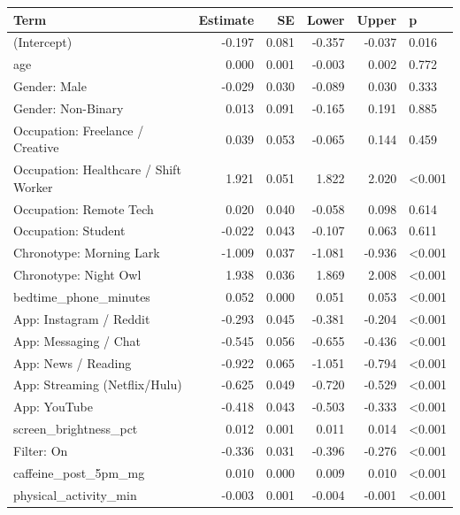 
\begin{tabular}{lrrrrl}
\toprule
Term & Estimate & SE & Lower & Upper & p\\
\midrule
(Intercept) & -0.197 & 0.081 & -0.357 & -0.037 & 0.016\\
age & 0.000 & 0.001 & -0.003 & 0.002 & 0.772\\
Gender: Male & -0.029 & 0.030 & -0.089 & 0.030 & 0.333\\
Gender: Non-Binary & 0.013 & 0.091 & -0.165 & 0.191 & 0.885\\
Occupation: Freelance / Creative & 0.039 & 0.053 & -0.065 & 0.144 & 0.459\\
Occupation: Healthcare / Shift Worker & 1.921 & 0.051 & 1.822 & 2.020 & <0.001\\
Occupation: Remote Tech & 0.020 & 0.040 & -0.058 & 0.098 & 0.614\\
Occupation: Student & -0.022 & 0.043 & -0.107 & 0.063 & 0.611\\
Chronotype: Morning Lark & -1.009 & 0.037 & -1.081 & -0.936 & <0.001\\
Chronotype: Night Owl & 1.938 & 0.036 & 1.869 & 2.008 & <0.001\\
bedtime\_phone\_minutes & 0.052 & 0.000 & 0.051 & 0.053 & <0.001\\
App: Instagram / Reddit & -0.293 & 0.045 & -0.381 & -0.204 & <0.001\\
App: Messaging / Chat & -0.545 & 0.056 & -0.655 & -0.436 & <0.001\\
App: News / Reading & -0.922 & 0.065 & -1.051 & -0.794 & <0.001\\
App: Streaming (Netflix/Hulu) & -0.625 & 0.049 & -0.720 & -0.529 & <0.001\\
App: YouTube & -0.418 & 0.043 & -0.503 & -0.333 & <0.001\\
screen\_brightness\_pct & 0.012 & 0.001 & 0.011 & 0.014 & <0.001\\
Filter: On & -0.336 & 0.031 & -0.396 & -0.276 & <0.001\\
caffeine\_post\_5pm\_mg & 0.010 & 0.000 & 0.009 & 0.010 & <0.001\\
physical\_activity\_min & -0.003 & 0.001 & -0.004 & -0.001 & <0.001\\
\bottomrule
\end{tabular}
